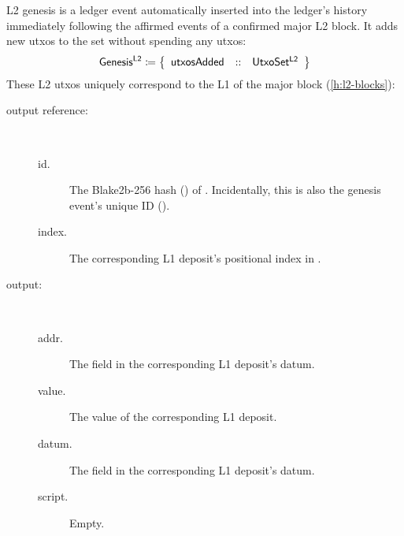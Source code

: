 \documentclass[../hydrozoa.tex]{subfiles}
\begin{document}
L2 genesis is a ledger event automatically inserted into the ledger's history immediately following the affirmed events of a confirmed major L2 block.
It adds new utxos to the  set without spending any utxos:
\begin{equation*}
  \mathsf{Genesis^{L2}} \coloneq \left\{
  \begin{array}{lll}
    \mathsf{utxosAdded} &::& \mathsf{UtxoSet^{L2}}
  \end{array}\right\}
\end{equation*}
These L2 utxos uniquely correspond to the L1  of the major block (\cref{h:l2-blocks}):
\begin{description}
  \item[output reference:]~
    \begin{description}
      \item[id.] The Blake2b-256 hash () of .
      Incidentally, this is also the genesis event's unique ID ().
      \item[index.] The corresponding L1 deposit's positional index in .
    \end{description}
  \item[output:]~
    \begin{description}
      \item[addr.] The  field in the corresponding L1 deposit's datum.
      \item[value.] The value of the corresponding L1 deposit.
      \item[datum.] The  field in the corresponding L1 deposit's datum.
      \item[script.] Empty.
    \end{description}
  \end{description}
\end{document}
